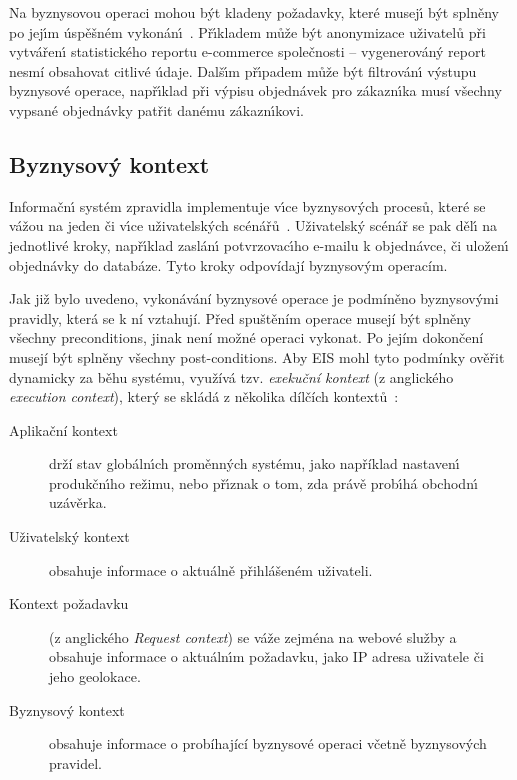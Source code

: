 Na byznysovou operaci mohou b\'yt kladeny požadavky, které
musej\'{\i} b\'yt splněny po jej\'{\i}m úspěšném vykonán\'{\i}~\cite{cemus2015automated}.
Př\'{\i}kladem může b\'yt anonymizace uživatelů při vytvářen\'{\i} statistického
reportu e-commerce společnosti -- vygenerováný report
nesmí obsahovat citlivé údaje. Dalš\'{\i}m př\'{\i}padem může b\'yt filtrován\'{\i}
v\'ystupu byznysové operace, např\'{\i}klad při v\'ypisu objednávek pro zákazn\'{\i}ka
musí všechny vypsané objednávky patřit danému zákazn\'{\i}kovi.

\subsection{Byznysov\'y kontext}

Informačn\'{\i} systém zpravidla implementuje v\'{\i}ce byznysov\'ych procesů, které se vážou
na jeden či v\'{\i}ce uživatelsk\'ych scénářů~\cite{larman2001patterns}. Uživatelsk\'y scénář se
pak děl\'{\i} na jednotlivé kroky, např\'{\i}klad zaslán\'{\i} potvrzovac\'{\i}ho e-mailu k objednávce,
či uložen\'{\i} objednávky do databáze. Tyto kroky odpovídají byznysovým operacím.

Jak již bylo uvedeno, vykonávání byznysové operace je podmíněno byznysovými pravidly, která se k ní vztahují. Před spuštěním operace musejí
být splněny všechny preconditions, jinak není možné operaci vykonat. Po jejím dokončení musejí být splněny všechny post-conditions.
Aby \gls{EIS} mohl tyto podmínky ověřit dynamicky za běhu systému, využívá tzv. \textit{exekuční kontext} (z anglického
\textit{execution context}), který se skládá z několika dílčích kontextů~\cite{cemus2017separation}:

\begin{description}
    \item[Aplikační kontext] drží stav globáln\'{\i}ch proměnn\'ych systému, jako například nastaven\'{\i}
    produkčn\'{\i}ho režimu, nebo př\'{\i}znak o tom, zda právě prob\'{\i}há obchodn\'{\i} uzávěrka.
    \item[Uživatelský kontext] obsahuje informace o aktuálně přihlášeném uživateli.
    \item[Kontext požadavku] (z anglického \textit{Request context}) se váže zejména na webové služby a obsahuje
    informace o aktuáln\'{\i}m požadavku, jako IP adresa uživatele či jeho geolokace.
    \item[Byznysov\'y kontext] obsahuje informace o probíhající byznysové operaci včetně byznysových pravidel.
\end{description}

